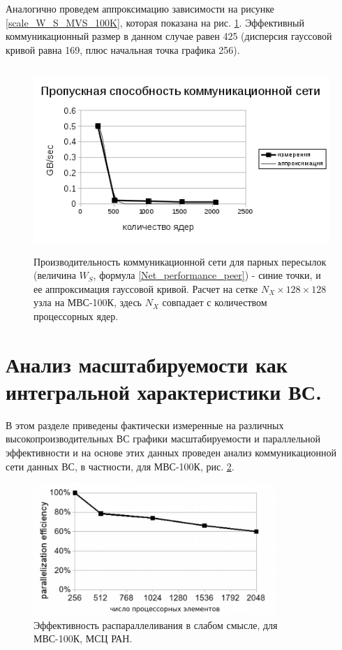 Аналогично проведем аппроксимацию зависимости на рисунке \ref{scale_W_S_MVS_100K}, которая показана на рис. \ref{scale_W_S_MVS_100K_Gauss}. Эффективный коммуникационный размер в данном случае равен 425 (дисперсия гауссовой кривой равна 169, плюс начальная точка графика 256).

 
\begin{figure}[h]
	\begin{center}
		\includegraphics[height=7cm,keepaspectratio]{images/W_S_MVS_100K_Gaussf.png}
		\caption{
			Производительность коммуникационной сети для парных пересылок (величина $W_S$, формула \ref{Net_performance_peer}) - синие точки, и ее аппроксимация гауссовой кривой. Расчет на сетке $N_X \times 128 \times 128$ узла на МВС-100К, здесь $N_X$ совпадает с количеством процессорных ядер.
		}
		\label{scale_W_S_MVS_100K_Gauss}
	\end{center} 
\end{figure}

      
\clearpage	    
	    
	 

		
		
		\section{Анализ масштабируемости как интегральной характеристики ВС.}
		
		В этом разделе приведены фактически измеренные на различных высокопроизводительных ВС графики масштабируемости и параллельной эффективности и на основе этих данных проведен анализ коммуникационной сети данных ВС, в частности, для МВС-100К, рис. \ref{eff2}. 
		
		\begin{figure}[h]
			\begin{center}
				\includegraphics[height=5cm,keepaspectratio]{images/eff_weak_JSCC.png}
				\caption{
					Эффективность распараллеливания в слабом смысле, для МВС-100К, МСЦ РАН.
				}
				\label{eff2}
			\end{center} 
		\end{figure}
		
